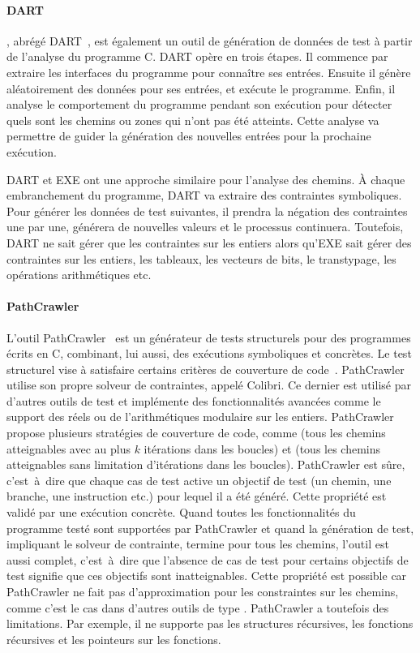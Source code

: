 \paragraph{DART} , abrégé
DART~, est également un outil de génération de données de
test à partir de l'analyse du programme C. DART opère en trois étapes. Il
commence par extraire les interfaces du programme pour connaître ses entrées.
Ensuite il génère aléatoirement des données pour ses entrées, et exécute le
programme.  Enfin, il analyse le comportement du programme pendant son exécution
pour détecter quels sont les chemins ou zones qui n'ont pas été atteints. Cette
analyse va permettre de guider la génération des nouvelles entrées pour la
prochaine exécution.

DART et EXE ont une approche similaire pour l'analyse des chemins. À chaque
embranchement du programme, DART va extraire des contraintes symboliques. Pour
générer les données de test suivantes, il prendra la négation des contraintes
une par une, générera de nouvelles valeurs et le processus continuera.
Toutefois, DART ne sait gérer que les contraintes sur les entiers alors qu'EXE
sait gérer des contraintes sur les entiers, les tableaux, les vecteurs de bits,
le transtypage, les opérations arithmétiques etc.

\paragraph{PathCrawler} L'outil PathCrawler~ est un générateur de tests structurels pour des programmes
écrits en C, combinant, lui aussi, des exécutions symboliques et concrètes. Le
test structurel vise à satisfaire certains critères de couverture de
code~.  PathCrawler utilise son propre
solveur de contraintes, appelé Colibri. Ce dernier est utilisé par d'autres
outils de test et implémente des fonctionnalités avancées comme le support des
réels ou de l'arithmétiques modulaire sur les entiers. PathCrawler propose
plusieurs stratégies de couverture de code, comme 
(tous les chemins atteignables avec au plus $k$ itérations dans les boucles) et
 (tous les chemins atteignables sans limitation
d'itérations dans les boucles). PathCrawler est sûre, c'est~à~dire que chaque
cas de test active un objectif de test (un chemin, une branche, une instruction
etc.) pour lequel il a été généré. Cette propriété est validé par une exécution
concrète. Quand toutes les fonctionnalités du programme testé sont supportées
par PathCrawler et quand la génération de test, impliquant le solveur de
contrainte, termine pour tous les chemins, l'outil est aussi complet,
c'est~à~dire que l'absence de cas de test pour certains objectifs de test
signifie que ces objectifs sont inatteignables. Cette propriété est possible car
PathCrawler ne fait pas d'approximation pour les constraintes sur les chemins,
comme c'est le cas dans d'autres outils de type .
PathCrawler a toutefois des limitations. Par exemple, il ne supporte pas les
structures récursives, les fonctions récursives et les pointeurs sur les
fonctions. \\

